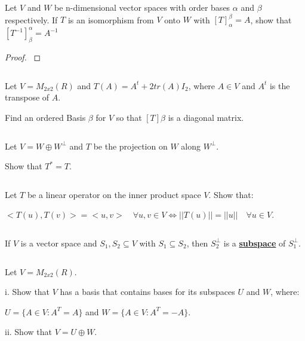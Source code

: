 \documentclass{article}
\newenvironment{customthm}[1]
  {\renewcommand\theinnercustomthm{#1}\innercustomthm}
  {\endinnercustomthm}
\begin{document}
\begin{customthm}{8}[2023.S(2.B), 2021.F(2.A)]
  $ $

  Let $V$ and $W$ be n-dimensional vector spaces with order bases $\alpha$ and $\beta$ respectively. If $T$ is an isomorphism from $V$ onto $W$ with $[T]_\alpha^\beta = A$, show that $[T^{-1}]_\beta^\alpha = A^{-1}$

\end{customthm}

\begin{proof}
  $ $

  


\end{proof}
\newpage

\begin{customthm}{9}[2023.S(2.C)]
  $ $

  Let $V = M_{2x2}(R)$ and $T(A) = A^t + 2tr(A)I_2$, where $A \in V$ and $A^t$ is the transpose of $A$.

  Find an ordered Basis $\beta$ for $V$ so that $[T]\beta$ is a diagonal matrix.
\end{customthm}


\begin{customthm}{10}[2023.S(3.B)]
  $ $

  Let $V = W \oplus W^\perp$ and $T$ be the projection on $W$ along $W^\perp$.
  
  Show that $T^* = T$.
\end{customthm}


\begin{customthm}{11}[2023.S(3.C)]
  $ $

  Let $T$ be a linear operator on the inner product space $V$. Show that:

  $<T(u), T(v)> = <u, v> \quad \forall u,v \in V \iff ||T(u)|| = ||u|| \quad \forall u \in V$.
\end{customthm}



\begin{customthm}{12}[2022.S(1.A.i)]
  $ $

  If $V$ is a vector space and $S_1, S_2 \subseteq V$ with $S_1 \subseteq S_2$, then $S_2^\perp$ is a \textbf{\underline{subspace}} of $S_1^\perp$.
\end{customthm}

\begin{customthm}{13}[2022.S(1.B)]
  $ $

  Let $V=M_{2x2}(R)$.
  
  i. Show that $V$ has a basis that contains bases for its subspaces $U$ and $W$, where:
  
  \qquad $U = \{ A \in V: A^T = A \}$ and $W = \{ A \in V: A^T = -A \}$.

  ii. Show that $V = U \oplus W$.
\end{customthm}
\end{document}
